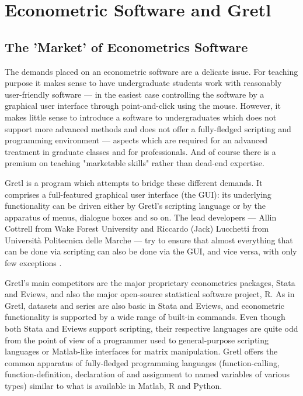 \documentclass[11pt]{article}
\newcommand{\remph}[1]{{\color{myred}#1}}
\begin{document}
\section{Econometric Software and Gretl}

\subsection{The 'Market' of Econometrics Software}
The demands placed on an econometric software are a delicate issue. For teaching purpose it makes sense to have undergraduate students work with reasonably user-friendly software --- in the easiest case controlling the software by a graphical user interface through point-and-click using the mouse. However, it makes little sense to introduce a software to undergraduates which does not support more advanced methods and does not offer a fully-fledged scripting and programming environment --- aspects which are required for an advanced treatment in graduate classes and for professionals. And of course there is a premium on teaching "marketable skills" rather than dead-end expertise.

Gretl is a program which attempts to bridge these different demands. It comprises a full-featured graphical user interface (the GUI): its underlying
functionality can be driven either by Gretl's scripting language or by the apparatus of menus, dialogue boxes and so on. The lead developers --- Allin Cottrell from Wake Forest University and Riccardo (Jack) Lucchetti from Università Politecnica delle Marche --- try to ensure that almost everything that can be done via scripting can also be done via the GUI, and vice versa, with only few exceptions \citep{Cottrell2017}.

Gretl's main competitors are the major proprietary econometrics packages, Stata and Eviews, and also the major open-source statistical software project, R. As in Gretl, datasets and series are also basic in Stata and Eviews, and econometric functionality is supported by a wide range of built-in commands. Even though both Stata and Eviews support scripting, their respective languages are quite odd from the point of view of a programmer used to general-purpose scripting languages or Matlab-like interfaces for matrix manipulation. %
Gretl offers the common apparatus of fully-fledged programming languages (function-calling, function-definition, declaration of and assignment to named variables of various types) similar to what is available in Matlab, R and Python.
\end{document}
